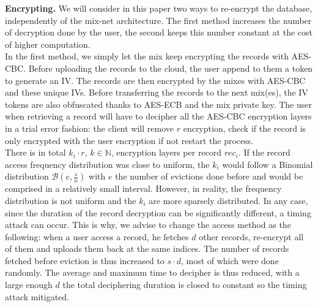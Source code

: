 \documentclass{llncs}
\begin{document}
\noindent\textbf{Encrypting.} We will consider in this paper two ways to re-encrypt the database, independently of the mix-net architecture. The first method increases the number of decryption done by the user, the second keeps this number constant at the cost of higher computation.\\
In the first method, we simply let the mix keep encrypting the records with AES-CBC. Before uploading the records to the cloud, the user append to them a token to generate an IV. The records are then encrypted by the mixes with AES-CBC and these unique IVs. Before transferring the records to the next mix(es), the IV tokens are also obfuscated thanks to AES-ECB and the mix private key.
The user when retrieving a record will have to decipher all the AES-CBC encryption layers in a trial error fashion: the client will remove $r$ encryption, check if the record is only encrypted with the user encryption if not restart the process.\\
There is in total $k_i \cdot r$, $k\in \mathbb{N}$, encryption layers per record $rec_i$. If the record access frequency distribution was close to uniform, the $k_i$ would follow a Binomial distribution $\mathcal{B}\left ( e, \frac{s}{n}\right )$ with $e$ the number of evictions done before and would be comprised in a relatively small interval. However, in reality, the frequency distribution is not uniform and the $k_i$ are more sparsely distributed. In any case, since the duration of the record decryption can be significantly different, a timing attack can occur. This is why, we advise to change the access method as the following: when a user access a record, he fetches $d$ other records, re-encrypt all of them and uploads them back at the same indices. The number of records fetched before eviction is thus increased to $s\cdot d$, most of which were done randomly. The average and maximum time to decipher is thus reduced, with a large enough $d$ the total deciphering duration is closed to constant so the timing attack mitigated.\\
\end{document}
